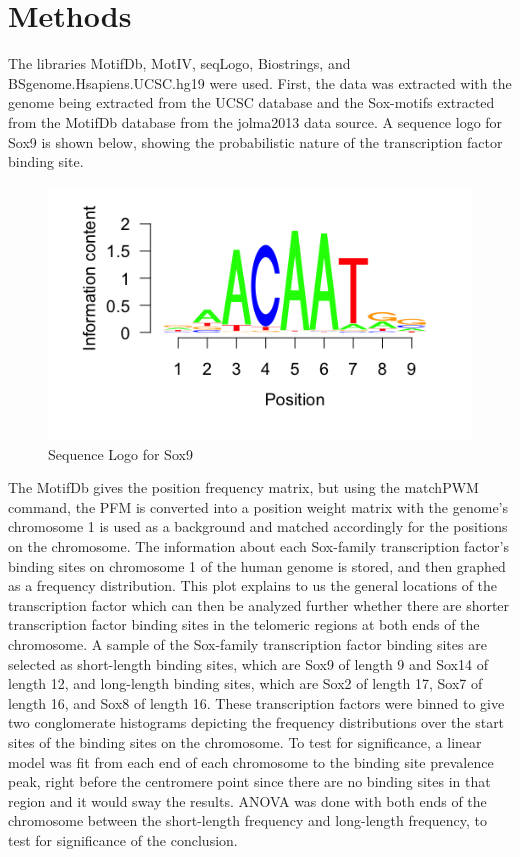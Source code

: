 \documentclass[12pt, a4paper]{article}
\begin{document}
\section{Methods}
The libraries MotifDb, MotIV, seqLogo, Biostrings, and BSgenome.Hsapiens.UCSC.hg19 were used. First, the data was extracted with the genome being extracted from the UCSC database and the Sox-motifs extracted from the MotifDb database from the jolma2013 data source. A sequence logo for Sox9 is shown below, showing the probabilistic nature of the transcription factor binding site. 
\begin{figure}[H]
\caption{Sequence Logo for Sox9}
\centering
\includegraphics[width=\textwidth]{seqlogo.png}
\end{figure}
The MotifDb gives the position frequency matrix, but using the matchPWM command, the PFM is converted into a position weight matrix with the genome's chromosome 1 is used as a background and matched accordingly for the positions on the chromosome. The information about each Sox-family transcription factor's binding sites on chromosome 1 of the human genome is stored, and then graphed as a frequency distribution. This plot explains to us the general locations of the transcription factor which can then be analyzed further whether there are shorter transcription factor binding sites in the telomeric regions at both ends of the chromosome. A sample of the Sox-family transcription factor binding sites are selected as short-length binding sites, which are Sox9 of length 9 and Sox14 of length 12, and long-length binding sites, which are Sox2 of length 17, Sox7 of length 16, and Sox8 of length 16. These transcription factors were binned to give two conglomerate histograms depicting the frequency distributions over the start sites of the binding sites on the chromosome. To test for significance, a linear model was fit from each end of each chromosome to the binding site prevalence peak, right before the centromere point since there are no binding sites in that region and it would sway the results. ANOVA was done with both ends of the chromosome between the short-length frequency and long-length frequency, to test for significance of the conclusion.
\end{document}
